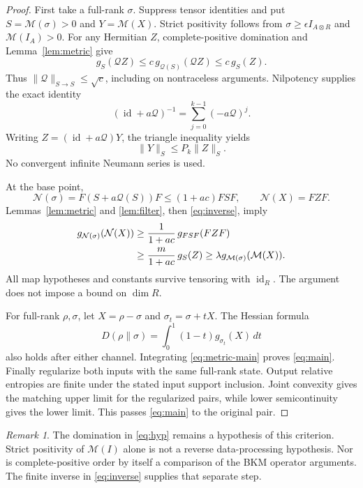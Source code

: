 \documentclass[11pt,a4paper]{article}
\theoremstyle{remark}\newtheorem{remark}[theorem]{Remark}
\newcommand{\id}{\operatorname{id}}
\newcommand{\cQ}{\mathcal Q}
\newcommand{\cM}{\mathcal M}
\newcommand{\cN}{\mathcal N}
\begin{document}
\begin{proof}
First take a full-rank $\sigma$.
Suppress tensor identities and put $S=\cM(\sigma)>0$ and $Y=\cM(X)$.
Strict positivity follows from
$\sigma\geq\epsilon I_{A\otimes R}$ and $\cM(I_A)>0$.
For any Hermitian $Z$, complete-positive domination and
Lemma~\ref{lem:metric} give
\begin{equation}
 g_S(\cQ Z)\leq c\,g_{\cQ(S)}(\cQ Z)\leq c\,g_S(Z).
 \label{eq:qnorm}
\end{equation}
Thus $\|\cQ\|_{S\to S}\leq\sqrt c$, including on nontraceless arguments.
Nilpotency supplies the exact identity
\[
 (\id+a\cQ)^{-1}=\sum_{j=0}^{k-1}(-a\cQ)^j.
\]
Writing $Z=(\id+a\cQ)Y$, the triangle inequality yields
\begin{equation}
 \|Y\|_S\leq P_k\|Z\|_S.
 \label{eq:inverse}
\end{equation}
No convergent infinite Neumann series is used.

At the base point,
\[
 \cN(\sigma)=F(S+a\cQ(S))F\leq(1+ac)FSF,
 \qquad \cN(X)=FZF.
\]
Lemmas~\ref{lem:metric} and \ref{lem:filter}, then
\eqref{eq:inverse}, imply
\begin{align}
 g_{\cN(\sigma)}(\cN(X))
 &\geq\frac{1}{1+ac}\,g_{FSF}(FZF) \notag\\
 &\geq\frac{m}{1+ac}\,g_S(Z)
 \geq\lambda g_{\cM(\sigma)}(\cM(X)).
 \label{eq:metric-main}
\end{align}
All map hypotheses and constants survive tensoring with $\id_R$.
The argument does not impose a bound on $\dim R$.

For full-rank $\rho,\sigma$, let $X=\rho-\sigma$ and
$\sigma_t=\sigma+tX$. The Hessian formula
\[
 D(\rho\|\sigma)=\int_0^1(1-t)g_{\sigma_t}(X)\,dt
\]
also holds after either channel. Integrating \eqref{eq:metric-main}
proves \eqref{eq:main}.
Finally regularize both inputs with the same full-rank state.
Output relative entropies are finite under the stated input support
inclusion. Joint convexity gives the matching upper limit for the
regularized pairs, while lower semicontinuity gives the lower limit.
This passes \eqref{eq:main} to the original pair.
\end{proof}

\begin{remark}
The domination in \eqref{eq:hyp} remains a hypothesis of this criterion.
Strict positivity of $\cM(I)$ alone is not a reverse data-processing
hypothesis. Nor is complete-positive order by itself a comparison of the
BKM operator arguments. The finite inverse in \eqref{eq:inverse} supplies
that separate step.
\end{remark}
\end{document}
